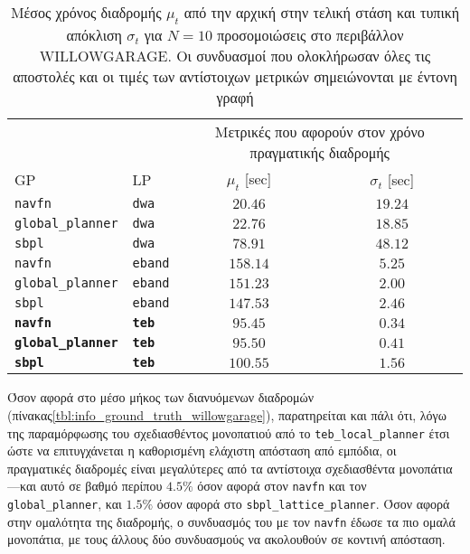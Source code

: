 \begin{table}[h]\centering
\renewcommand{\arraystretch}{1.3}
\begin{tabular}{llcc}
  & & \multicolumn{2}{c}{Μετρικές που αφορούν στον χρόνο πραγματικής διαδρομής} \\
  \cline{3-4}
  GP & LP & $\mu_{t}$ [sec] & $\sigma_{t}$ [sec] \\  \toprule
  \texttt{navfn} & \texttt{dwa} & $20.46$ & $19.24$ \\
  \texttt{global\_planner} & \texttt{dwa} & $22.76$ & $18.85$ \\
  \texttt{sbpl} & \texttt{dwa} & $78.91$ & $48.12$ \\
  \texttt{navfn} & \texttt{eband} & $158.14$ & $5.25$ \\
  \texttt{global\_planner} & \texttt{eband} & $151.23$ & $2.00$ \\
  \texttt{sbpl} & \texttt{eband} & $147.53$ & $2.46$ \\
  \textbf{\texttt{navfn}} & \textbf{\texttt{teb}} & $\bm{95.45}$ & $\bm{0.34}$ \\
  \textbf{\texttt{global\_planner}} & \textbf{\texttt{teb}} & $\bm{95.50}$ & $\bm{0.41}$ \\
  \textbf{\texttt{sbpl}} & \textbf{\texttt{teb}} & $\bm{100.55}$ & $\bm{1.56}$ \\ \bottomrule
\end{tabular}
\caption{\small Μέσος χρόνος διαδρομής $\mu_{t}$ από την αρχική στην τελική
         στάση και τυπική απόκλιση $\sigma_{t}$ για $N=10$ προσομοιώσεις στο
         περιβάλλον WILLOWGARAGE. Οι συνδυασμοί που ολοκλήρωσαν όλες τις
         αποστολές και οι τιμές των αντίστοιχων μετρικών σημειώνονται με έντονη
         γραφή}
\label{tbl:info_pose_willowgarage}
\end{table}

Όσον αφορά στο μέσο μήκος των διανυόμενων διαδρομών
(πίνακας\ref{tbl:info_ground_truth_willowgarage}), παρατηρείται και πάλι ότι,
λόγω της παραμόρφωσης του σχεδιασθέντος μονοπατιού από το
\texttt{teb\_local\_planner} έτσι ώστε να επιτυγχάνεται η καθορισμένη ελάχιστη
απόσταση από εμπόδια, οι πραγματικές διαδρομές είναι μεγαλύτερες από τα
αντίστοιχα σχεδιασθέντα μονοπάτια---και αυτό σε βαθμό περίπου $4.5\%$ όσον
αφορά στον \texttt{navfn} και τον \texttt{global\_planner}, και $1.5\%$ όσον
αφορά στο \texttt{sbpl\_lattice\_planner}. Όσον αφορά στην ομαλότητα της
διαδρομής, ο συνδυασμός του με τον \texttt{navfn} έδωσε τα πιο ομαλά μονοπάτια,
με τους άλλους δύο συνδυασμούς να ακολουθούν σε κοντινή απόσταση.

